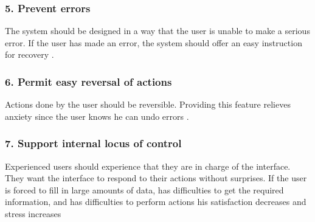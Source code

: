 \subsubsection{5. Prevent errors}
The system should be designed in a way that the user is unable to make a serious error. If the user has made an error, the system should offer an easy instruction for recovery \cite{schneiderman}.

\subsubsection{6. Permit easy reversal of actions}
Actions done by the user should be reversible. Providing this feature relieves anxiety since the user knows he can undo errors \cite{schneiderman}.

\subsubsection{7. Support internal locus of control}
Experienced users should experience that they are in charge of the interface. They want the interface to respond to their actions without surprises. If the user is forced to fill in large amounts of data, has difficulties to get the required information, and has difficulties to perform actions his satisfaction decreases and stress increases \cite{schneiderman}
\newpage